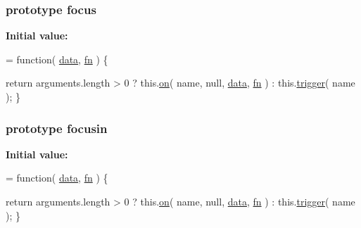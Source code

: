 \subsubsection[{focus}]{ {\bf prototype} focus}\label{jquery-1_810_82-vsdoc_8js_a2bab6fb1fd05f2802566c86887bdc7a2}
{\bfseries Initial value\+:}
\begin{DoxyCode}
= \textcolor{keyword}{function}( \hyperlink{jquery-1_810_82-vsdoc_8js_a609407b3456fdc3c5671a9fc4a226ff7}{data}, \hyperlink{jquery-1_810_82-vsdoc_8js_acef6bdaf6b9b20fdcca1ea86f0902c3b}{fn} ) \{


        \textcolor{keywordflow}{return} arguments.length > 0 ?
            this.\hyperlink{jquery-1_810_82-vsdoc_8js_ae453b412b883f60220d73468ef6c6dbc}{on}( name, null, \hyperlink{jquery-1_810_82-vsdoc_8js_a609407b3456fdc3c5671a9fc4a226ff7}{data}, \hyperlink{jquery-1_810_82-vsdoc_8js_acef6bdaf6b9b20fdcca1ea86f0902c3b}{fn} ) :
            this.\hyperlink{jquery-1_810_82-vsdoc_8js_a2388c4114d5e3e4eab020f973641519c}{trigger}( name );
    \}
\end{DoxyCode}
\hypertarget{jquery-1_810_82-vsdoc_8js_a332119e7a3f7f91d04142c0b0ef4d719}{}
\subsubsection[{focusin}]{ {\bf prototype} focusin}\label{jquery-1_810_82-vsdoc_8js_a332119e7a3f7f91d04142c0b0ef4d719}
{\bfseries Initial value\+:}
\begin{DoxyCode}
= \textcolor{keyword}{function}( \hyperlink{jquery-1_810_82-vsdoc_8js_a609407b3456fdc3c5671a9fc4a226ff7}{data}, \hyperlink{jquery-1_810_82-vsdoc_8js_acef6bdaf6b9b20fdcca1ea86f0902c3b}{fn} ) \{


        \textcolor{keywordflow}{return} arguments.length > 0 ?
            this.\hyperlink{jquery-1_810_82-vsdoc_8js_ae453b412b883f60220d73468ef6c6dbc}{on}( name, null, \hyperlink{jquery-1_810_82-vsdoc_8js_a609407b3456fdc3c5671a9fc4a226ff7}{data}, \hyperlink{jquery-1_810_82-vsdoc_8js_acef6bdaf6b9b20fdcca1ea86f0902c3b}{fn} ) :
            this.\hyperlink{jquery-1_810_82-vsdoc_8js_a2388c4114d5e3e4eab020f973641519c}{trigger}( name );
    \}
\end{DoxyCode}
\hypertarget{jquery-1_810_82-vsdoc_8js_ac5fd3487b99e86d52fbef52f40d31565}{}
